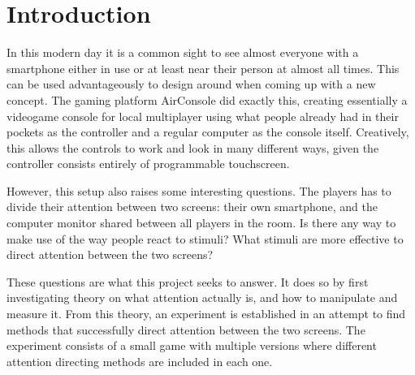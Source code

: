 \chapter{Introduction}\label{ch:intro}
In this modern day it is a common sight to see almost everyone with a smartphone either in use or at least near their person at almost all times. This can be used advantageously to design around when coming up with a new concept. The gaming platform AirConsole did exactly this, creating essentially a videogame console for local multiplayer using what people already had in their pockets as the controller and a regular computer as the console itself. Creatively, this allows the controls to work and look in many different ways, given the controller consists entirely of programmable touchscreen.

However, this setup also raises some interesting questions. The players has to divide their attention between two screens: their own smartphone, and the computer monitor shared between all players in the room. Is there any way to make use of the way people react to stimuli? What stimuli are more effective to direct attention between the two screens?

These questions are what this project seeks to answer. It does so by first investigating theory on what attention actually is, and how to manipulate and measure it. From this theory, an experiment is established in an attempt to find methods that successfully direct attention between the two screens. The experiment consists of a small game with multiple versions where different attention directing methods are included in each one.